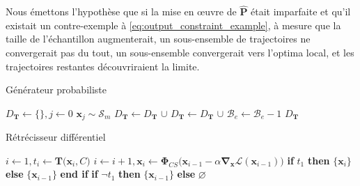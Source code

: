 Nous émettons l'hypothèse que si la mise en œuvre de $\mathbf{\hat P}$ était imparfaite et qu'il existait un contre-exemple à \autoref{eq:output_constraint_example}, à mesure que la taille de l'échantillon augmenterait, un sous-ensemble de trajectoires ne convergerait pas du tout, un sous-ensemble convergerait vers l'optima local, et les trajectoires restantes découvriraient la limite.

\begin{algorithm}[ht]
\caption{Générateur probabiliste}
\label{alg:prob_adversary}
\begin{algorithmic}[1]
\State $D_\mathbf T \gets \{\}, j \gets 0$
\State $\mathbf{x}_j \sim \mathcal S_m$
 
\State $D_\mathbf T \gets D_\mathbf T$ $\cup$ 
\Else {}
\State $D_\mathbf T \gets D_\mathbf T$ $\cup$  
\EndIf
\State $\mathcal{B}_e \gets \mathcal{B}_e - 1$
\EndWhile
\State \Return $D_\mathbf T$
\EndProcedure
\end{algorithmic}
\end{algorithm}

\begin{algorithm}[ht]
\caption{Rétrécisseur différentiel}
\label{alg:diff_adversary}
\begin{algorithmic}[1]
\State $i \gets 1, t_i \gets \mathbf T\big(\mathbf x_i, C\big)$ 
\Do
    \State $i \gets i + 1, \mathbf x_i \gets \bm\Phi_{CS}\big(\mathbf x_{i-1} - \alpha\mathbf\nabla_{\mathbf x} \mathcal{L}(\mathbf{x}_{i-1})\big)$ 
     
    \State \Return \textbf{if } $t_1$ \textbf{ then } $\{\mathbf{x}_{i}\}$ \textbf{ else } $\{\mathbf{x}_{i-1}\}$ \textbf{ end if} 
    \EndIf
{} 
\State \Return \textbf{if } $\neg t_1$ \textbf{ then } $\{\mathbf x_{i-1}\}$ \textbf{ else } $\varnothing$ 
\EndProcedure
\end{algorithmic}
\end{algorithm}

